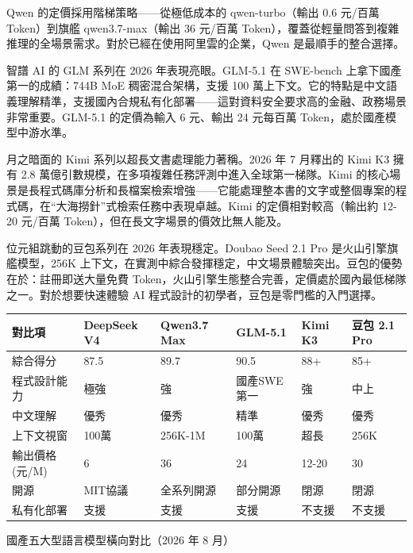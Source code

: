 Qwen 的定價採用階梯策略——從極低成本的 qwen-turbo（輸出 0.6 元/百萬 Token）到旗艦 qwen3.7-max（輸出 36 元/百萬 Token），覆蓋從輕量問答到複雜推理的全場景需求。對於已經在使用阿里雲的企業，Qwen 是最順手的整合選擇。


智譜 AI 的 GLM 系列在 2026 年表現亮眼。GLM-5.1 在 SWE-bench 上拿下國產第一的成績：744B MoE 稠密混合架構，支援 100 萬上下文。它的特點是中文語義理解精準，支援國內合規私有化部署——這對資料安全要求高的金融、政務場景非常重要。GLM-5.1 的定價為輸入 6 元、輸出 24 元每百萬 Token，處於國產模型中游水準。


月之暗面的 Kimi 系列以超長文書處理能力著稱。2026 年 7 月釋出的 Kimi K3 擁有 2.8 萬億引數規模，在多項複雜任務評測中進入全球第一梯隊。Kimi 的核心場景是長程式碼庫分析和長檔案檢索增強——它能處理整本書的文字或整個專案的程式碼，在“大海撈針”式檢索任務中表現卓越。Kimi 的定價相對較高（輸出約 12-20 元/百萬 Token），但在長文字場景的價效比無人能及。


位元組跳動的豆包系列在 2026 年表現穩定。Doubao Seed 2.1 Pro 是火山引擎旗艦模型，256K 上下文，在實測中綜合發揮穩定，中文場景體驗突出。豆包的優勢在於：註冊即送大量免費 Token，火山引擎生態整合完善，定價處於國內最低梯隊之一。對於想要快速體驗 AI 程式設計的初學者，豆包是零門檻的入門選擇。

\begin{center}
\begin{tabularx}{\linewidth}{|X|X|X|X|X|X|}
\hline
\textbf{對比項} & \textbf{DeepSeek V4} & \textbf{Qwen3.7 Max} & \textbf{GLM-5.1} & \textbf{Kimi K3} & \textbf{豆包 2.1 Pro} \tabularnewline
\hline
綜合得分 & 87.5 & 89.7 & 90.5 & 88+ & 85+ \tabularnewline
程式設計能力 & 極強 & 強 & 國產SWE第一 & 強 & 中上 \tabularnewline
中文理解 & 優秀 & 優秀 & 精準 & 優秀 & 優秀 \tabularnewline
上下文視窗 & 100萬 & 256K-1M & 100萬 & 超長 & 256K \tabularnewline
輸出價格(元/M) & 6 & 36 & 24 & 12-20 & 30 \tabularnewline
開源 & MIT協議 & 全系列開源 & 部分開源 & 閉源 & 閉源 \tabularnewline
私有化部署 & 支援 & 支援 & 支援 & 不支援 & 不支援 \tabularnewline
\hline
\end{tabularx}
\end{center}

\begin{center}\small\color{gray}國產五大型語言模型橫向對比（2026 年 8 月）\end{center}


